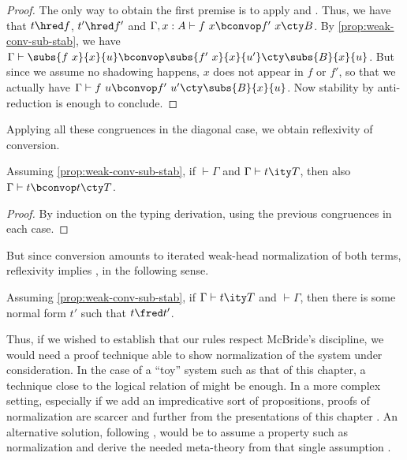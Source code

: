 \begin{proof}
  The only way to obtain the first premise is to apply  and
  . Thus, we have that $t \hred f$, $t' \hred f'$ and
  $\bconv{\Gamma, x : A}{f\ x}{f'\ x}{B}$. By \cref{prop:weak-conv-sub-stab}, we have
  $\bconv{\Gamma}{\subs{f\ x}{x}{u}}{\subs{f'\ x}{x}{u'}}{\subs{B}{x}{u}}$.
  But since we assume no shadowing happens, $x$ does not appear in $f$ or $f'$, so that
  we actually have $\bconv{\Gamma}{f\ u}{f'\ u'}{\subs{B}{x}{u}}$.
  Now stability by anti-reduction is enough to conclude.
\end{proof}

Applying all these congruences in the diagonal case, we obtain reflexivity of conversion.

\begin{proposition}[Reflexivity]
  Assuming \cref{prop:weak-conv-sub-stab}, if $\vdash \Gamma$ and
  $\inferty{\Gamma}{t}{T}$, then also $\bconv{\Gamma}{t}{t}{T}$.
\end{proposition}

\begin{proof}
  By induction on the typing derivation, using the previous congruences in each case.
\end{proof}

But since conversion amounts to iterated weak-head normalization of both terms,
reflexivity implies , in the following sense.

\begin{proposition}[Normalization]
  Assuming \cref{prop:weak-conv-sub-stab}, if $\inferty{\Gamma}{t}{T}$ and
  $\vdash \Gamma$, then there is some normal form $t'$ such that $t \red t'$.
\end{proposition}

Thus, if we wished to establish that our rules respect McBride’s discipline, we
would need a proof technique able to show normalization of the system under consideration.
In the case of a “toy” system such as that of this chapter, a technique close to the logical
relation of  might be enough. In a more complex setting, especially if
we add an impredicative sort of propositions, proofs of normalization are scarcer and
further from the presentations of this chapter .
An alternative solution, following ,
would be to assume a property such as normalization and derive the needed meta-theory from
that single assumption .


